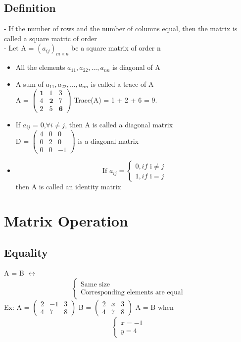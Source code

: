 \documentclass[12pt]{article}
\begin{document}
\subsection{Definition}
- If the number of rows and the number of columns equal, then the matrix is called a square matric of order \\
- Let A = $(a_{ij})_{m \times n}$ be a square matrix of order n
\begin{itemize}
	\item All the elements $a_{11}, a_{22}, \ldots, a_{nn}$ is diagonal of A
	\item A sum of $a_{11}, a_{22}, \ldots, a_{nn}$ is called a trace of A \\
	A = 
	$\begin{pmatrix}
		\textbf{1} & 1 & 3 \\
		4 & \textbf{2} & 7 \\
		2 & 5 & \textbf{6}
	\end{pmatrix}$
	\bigbreak
	Trace(A) = 1 + 2 + 6 = 9.
	\item If $a_{ij}$ = 0,$\forall i \not = j$, then A is called a diagonal matrix \\
	D = 
	$\begin{pmatrix}
		4 & 0 & 0 \\
		0 & 2 & 0 \\
		0 & 0 & -1
	\end{pmatrix}$
	is a diagonal matrix
	\bigbreak
	\item
	 $$ 
	 \mbox{If } a_{ij} =
	\begin{cases}
    0, if \mbox{ i} \not = j \\
    1, if \mbox{ i} =j  
	\end{cases}
	$$
    then A is called an identity matrix
\end{itemize}
\section{Matrix Operation}
\subsection{Equality}
A = B $\leftrightarrow$
$$
\begin{cases}
\mbox{Same size} \\
\mbox{Corresponding elements are equal} 
\end{cases}
$$
Ex:
A = 
$\begin{pmatrix}
2 & -1 & 3 \\
4 & 7 & 8
\end{pmatrix}$
\bigbreak
B = 
$\begin{pmatrix}
2 & x & 3 \\
4 & 7 & 8 
\end{pmatrix}$
\bigbreak
A = B when 
$$
\begin{cases}
x = -1 \\
y = 4
\end{cases}
$$
\end{document}
